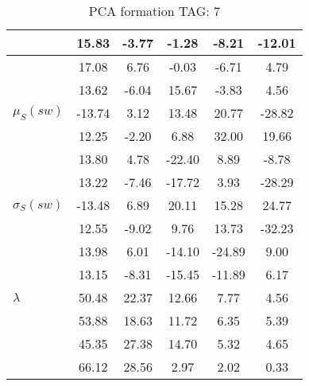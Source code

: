 \begin{table}[h!]
\begin{center}
\begin{tabular}{| l | c | c | c | c | c |}
 & 15.83  & -3.77  & -1.28  & -8.21  & -12.01 \\\hline
 & 17.08  & 6.76  & -0.03  & -6.71  & 4.79 \\\hline
 & 13.62  & -6.04  & 15.67  & -3.83  & 4.56 \\\hline
$\mu_S(sw)$ & -13.74  & 3.12  & 13.48  & 20.77  & -28.82 \\\hline
 & 12.25  & -2.20  & 6.88  & 32.00  & 19.66 \\\hline
 & 13.80  & 4.78  & -22.40  & 8.89  & -8.78 \\\hline
 & 13.22  & -7.46  & -17.72  & 3.93  & -28.29 \\\hline
$\sigma_S(sw)$ & -13.48  & 6.89  & 20.11  & 15.28  & 24.77 \\\hline
 & 12.55  & -9.02  & 9.76  & 13.73  & -32.23 \\\hline
 & 13.98  & 6.01  & -14.10  & -24.89  & 9.00 \\\hline
 & 13.15  & -8.31  & -15.45  & -11.89  & 6.17 \\\hline
$\lambda$ & 50.48  & 22.37  & 12.66  & 7.77  & 4.56 \\\hline
 & 53.88  & 18.63  & 11.72  & 6.35  & 5.39 \\\hline
 & 45.35  & 27.38  & 14.70  & 5.32  & 4.65 \\\hline
 & 66.12  & 28.56  & 2.97  & 2.02  & 0.33 \\\hline
\end{tabular}
\caption{PCA formation TAG: 7}
\end{center}
\end{table}